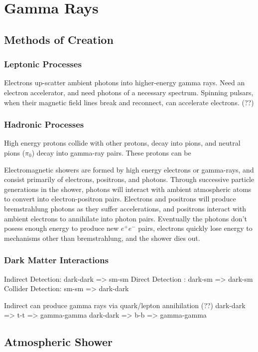 \cleartooddpage[\thispagestyle{empty}]
\chapter{Gamma Rays}


\section{Methods of Creation}

\subsection{Leptonic Processes}
Electrons up-scatter ambient photons into higher-energy gamma rays.
Need an electron accelerator, and need photons of a necessary spectrum.
Spinning pulsars, when their magnetic field lines break and reconnect, can accelerate electrons. (??)

\subsection{Hadronic Processes}
High energy protons collide with other protons, decay into pions, and neutral pions ($\pi_{0}$) decay into gamma-ray pairs.
These protons can be 

Electromagnetic showers are formed by high energy electrons or gamma-rays, and consist primarily of electrons, positrons, and photons.
Through successive particle generations in the shower, photons will interact with ambient atmospheric atoms to convert into electron-positron pairs.
Electrons and positrons will produce bremstrahlung photons as they suffer accelerations, and positrons interact with ambient electrons to annihilate into photon pairs.
Eventually the photons don't posess enough energy to produce new $e^{+}e^{-}$ pairs, electrons quickly lose energy to mechanisms other than bremstrahlung, and the shower dies out.


\subsection{Dark Matter Interactions}
Indirect Detection: dark-dark => sm-sm
Direct Detection  : dark-sm => dark-sm
Collider Detection: sm-sm => dark-dark

Indirect can produce gamma rays via quark/lepton annihilation (??)
dark-dark => t-t => gamma-gamma
dark-dark => b-b => gamma-gamma


\section{Atmospheric Shower}

